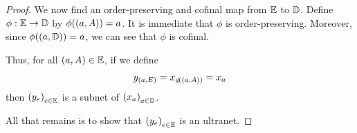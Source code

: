 \begin{proof}
    We now find an order-preserving and cofinal map from $\mathbb{E}$ to $\mathbb{D}$. Define $\phi : \mathbb{E} \to \mathbb{D}$ by $\phi\!\left( \left( a, A \right) \right) = a$. It is immediate that $\phi$ is order-preserving. Moreover, since $\phi\!\left( \left( a, \mathbb{D} \right) \right) = a$, we can see that $\phi$ is cofinal.

    Thus, for all $\left( a, A \right) \in \mathbb{E}$, if we define
    \begin{align*}
        y_{\left( a, E \right)} = x_{\phi\!\left( \left( a, A \right) \right)} = x_a
    \end{align*}
    then $\left( y_{e} \right)_{e \in \mathbb{E}}$ is a subnet of $\left( x_a \right)_{a \in \mathbb{D}}$.

    All that remains is to show that $\left( y_e \right)_{e \in \mathbb{E}}$ is an ultranet. \sorry
\end{proof}